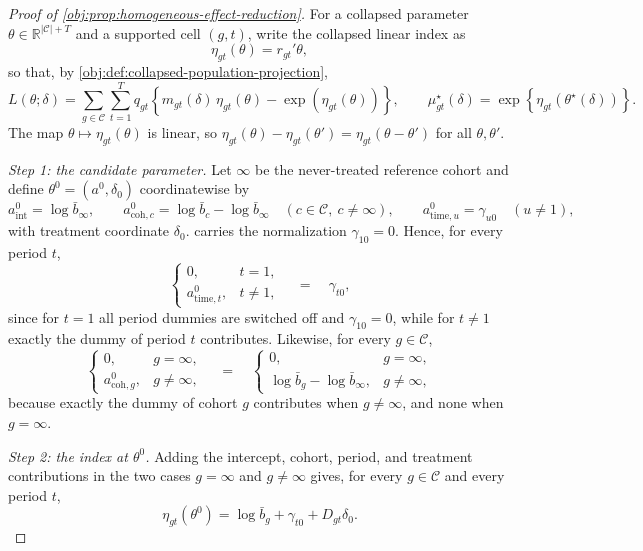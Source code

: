 \begin{proof}[Proof of \cref{obj:prop:homogeneous-effect-reduction}]
For a collapsed parameter \(\theta\in\mathbb R^{|\mathcal C|+T}\) and a supported cell \((g,t)\), write the collapsed linear index as
\[
\eta_{gt}(\theta)=r_{gt}'\theta,
\]
so that, by \cref{obj:def:collapsed-population-projection},
\[
L(\theta;\delta)
=
\sum_{g\in\mathcal C}\sum_{t=1}^T
q_{gt}\left\{m_{gt}(\delta)\,\eta_{gt}(\theta)-\exp\!\left(\eta_{gt}(\theta)\right)\right\},
\qquad
\mu^\star_{gt}(\delta)=\exp\!\left\{\eta_{gt}(\theta^\star(\delta))\right\}.
\]
The map \(\theta\mapsto\eta_{gt}(\theta)\) is linear, so \(\eta_{gt}(\theta)-\eta_{gt}(\theta')=\eta_{gt}(\theta-\theta')\) for all \(\theta,\theta'\).

\textit{Step 1: the candidate parameter.} Let \(\infty\) be the never-treated reference cohort and define \(\theta^0=(a^0,\delta_0)\) coordinatewise by
\[
a^0_{\text{int}}=\log\bar b_\infty,
\qquad
a^0_{\text{coh},c}=\log\bar b_c-\log\bar b_\infty\quad(c\in\mathcal C,\ c\neq\infty),
\qquad
a^0_{\text{time},u}=\gamma_{u0}\quad(u\neq1),
\]
with treatment coordinate \(\delta_0\).
 carries the normalization \(\gamma_{10}=0\). Hence, for every period \(t\),
\[
\begin{cases}
0, & t=1,\\
a^0_{\text{time},t}, & t\neq1,
\end{cases}
\quad=\quad\gamma_{t0},
\]
since for \(t=1\) all period dummies are switched off and \(\gamma_{10}=0\), while for \(t\neq1\) exactly the dummy of period \(t\) contributes. Likewise, for every \(g\in\mathcal C\),
\[
\begin{cases}
0, & g=\infty,\\
a^0_{\text{coh},g}, & g\neq\infty,
\end{cases}
\quad=\quad
\begin{cases}
0, & g=\infty,\\
\log\bar b_g-\log\bar b_\infty, & g\neq\infty,
\end{cases}
\]
because exactly the dummy of cohort \(g\) contributes when \(g\neq\infty\), and none when \(g=\infty\).

\textit{Step 2: the index at \(\theta^0\).} Adding the intercept, cohort, period, and treatment contributions in the two cases \(g=\infty\) and \(g\neq\infty\) gives, for every \(g\in\mathcal C\) and every period \(t\),
\[
\eta_{gt}(\theta^0)=\log\bar b_g+\gamma_{t0}+D_{gt}\delta_0 .
\]


\end{proof}
